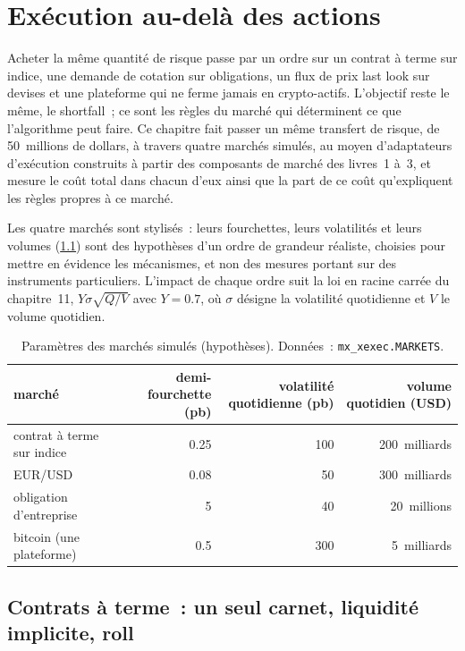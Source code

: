 \chapter{Exécution au-delà des actions}\label{ch:mx:execution-beyond-equities}

Acheter la même quantité de risque passe par un ordre sur un contrat à terme sur indice, une demande de cotation sur obligations, un flux de prix last look sur devises et
une plateforme qui ne ferme jamais en crypto-actifs. L'objectif reste le même, le shortfall~; ce sont les règles du marché qui déterminent ce que l'algorithme peut faire. Ce chapitre fait passer un même
transfert de risque, de 50~millions de dollars, à travers quatre marchés simulés, au moyen d'adaptateurs d'exécution construits à partir des composants de marché des livres~1 à~3, et
mesure le coût total dans chacun d'eux ainsi que la part de ce coût qu'expliquent les règles propres à ce marché.

Les quatre marchés sont stylisés~: leurs fourchettes, leurs volatilités et leurs volumes (\cref{tab:mx:execution-beyond-equities:markets}) sont des hypothèses
d'un ordre de grandeur réaliste, choisies pour mettre en évidence les mécanismes, et non des mesures portant sur des instruments particuliers. L'impact de chaque ordre suit la loi en racine carrée
du chapitre~11, $Y\sigma\sqrt{Q/V}$ avec $Y=0.7$, où $\sigma$ désigne la volatilité quotidienne et $V$ le volume quotidien.

\begin{table}[ht]
\centering
\small
\begin{tabular}{@{}lrrr@{}}
\toprule
marché & demi-fourchette (pb) & volatilité quotidienne (pb) & volume quotidien (USD) \\
\midrule
contrat à terme sur indice & 0.25 & 100 & 200~milliards \\
EUR/USD & 0.08 & 50 & 300~milliards \\
obligation d'entreprise & 5 & 40 & 20~millions \\
bitcoin (une plateforme) & 0.5 & 300 & 5~milliards \\
\bottomrule
\end{tabular}
\caption{Paramètres des marchés simulés (hypothèses). Données~: \texttt{mx\_xexec.MARKETS}.}\label{tab:mx:execution-beyond-equities:markets}
\end{table}

\section{Contrats à terme~: un seul carnet, liquidité implicite, roll}

